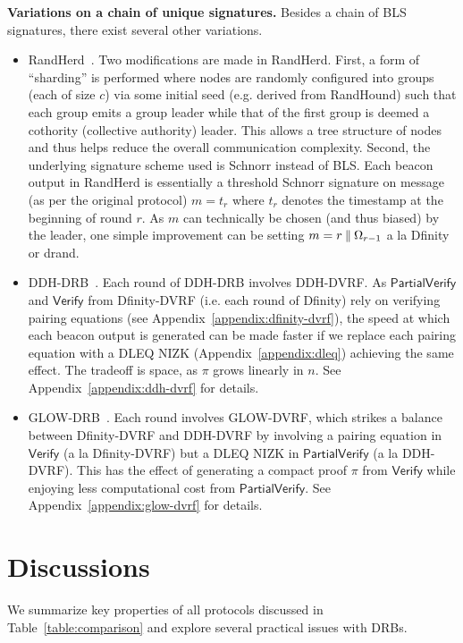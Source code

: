 \noindent\textbf{Variations on a chain of unique signatures.} Besides a chain of BLS signatures, there exist several other variations.
\begin{itemize}
\item RandHerd~\cite{syta2017scalable}. Two modifications are made in RandHerd. First, a form of ``sharding'' is performed where nodes are randomly configured into groups (each of size $c$) via some initial seed (e.g. derived from RandHound) such that each group emits a group leader while that of the first group is deemed a cothority (collective authority) leader. This allows a tree structure of nodes and thus helps reduce the overall communication complexity. Second, the underlying signature scheme used is Schnorr instead of BLS. Each beacon output in RandHerd is essentially a threshold Schnorr signature on message (as per the original protocol) $m = t_r$ where $t_r$ denotes the timestamp at the beginning of round $r$. As $m$ can technically be chosen (and thus biased) by the leader, one simple improvement can be setting $m = r \mathbin\Vert \Omega_{r - 1}$ a la Dfinity or drand.
\item DDH-DRB~\cite{galindo2020fully}. Each round of DDH-DRB involves DDH-DVRF. As $\mathsf{PartialVerify}$ and $\mathsf{Verify}$ from Dfinity-DVRF (i.e. each round of Dfinity) rely on verifying pairing equations (see Appendix~\ref{appendix:dfinity-dvrf}), the speed at which each beacon output is generated can be made faster if we replace each pairing equation with a DLEQ NIZK (Appendix~\ref{appendix:dleq}) achieving the same effect. The tradeoff is space, as $\pi$ grows linearly in $n$. See Appendix~\ref{appendix:ddh-dvrf} for details.
\item GLOW-DRB~\cite{galindo2020fully}. Each round involves GLOW-DVRF, which strikes a balance between Dfinity-DVRF and DDH-DVRF by involving a pairing equation in $\mathsf{Verify}$ (a la Dfinity-DVRF) but a DLEQ NIZK in $\mathsf{PartialVerify}$ (a la DDH-DVRF). This has the effect of generating a compact proof $\pi$ from $\mathsf{Verify}$ while enjoying less computational cost from $\mathsf{PartialVerify}$. See Appendix~\ref{appendix:glow-dvrf} for details.
\end{itemize}

\section{Discussions}
\label{section:discussions}
We summarize key properties of all protocols discussed in Table~\ref{table:comparison} and explore several practical issues with DRBs.

